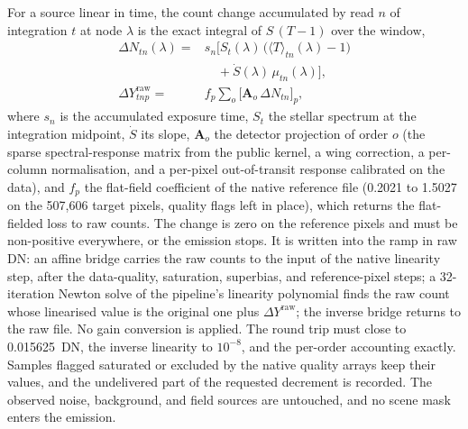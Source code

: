 
For a source linear in time, the count change accumulated by read $n$ of
integration $t$ at node $\lambda$ is the exact integral of $S\,(T-1)$
over the window,
\begin{equation}
\begin{split}
 \Delta N_{tn}(\lambda) = {}& s_n\big[S_t(\lambda)\,
 \big(\langle T\rangle_{tn}(\lambda)-1\big) \\
 &\quad +\dot S(\lambda)\,\mu_{tn}(\lambda)\big], \\
 \Delta Y^{\mathrm{raw}}_{tnp} = {}& f_p
 \sum_{o}\big[\bm{A}_o\,\Delta N_{tn}\big]_p ,
\end{split}
 \label{eq:v45-injector}
\end{equation}
where $s_n$ is the accumulated exposure time, $S_t$ the stellar spectrum
at the integration midpoint, $\dot S$ its slope, $\bm{A}_o$ the detector
projection of order $o$ (the sparse spectral-response matrix from the
public kernel, a wing correction, a per-column normalisation, and a
per-pixel out-of-transit response calibrated on the data), and $f_p$ the
flat-field coefficient of the native reference file (0.2021 to 1.5027 on
the 507{,}606 target pixels, quality flags left in place), which returns
the flat-fielded loss to raw counts.
The change is zero on the reference pixels and must be non-positive
everywhere, or the emission stops. It is written into the ramp in raw
DN: an affine bridge carries the raw counts to the input of the native
linearity step, after the data-quality, saturation, superbias, and
reference-pixel steps; a 32-iteration Newton solve of the pipeline's
linearity polynomial finds the raw count whose linearised value is the
original one plus $\Delta Y^{\mathrm{raw}}$; the inverse bridge returns
to the raw file. No gain conversion is applied. The round trip must close
to 0.015625~DN, the inverse linearity to $10^{-8}$, and the per-order
accounting exactly. Samples flagged saturated or excluded by the native
quality arrays keep their values, and the undelivered part of the
requested decrement is recorded. The observed noise, background, and
field sources are untouched, and no scene mask enters the emission.

